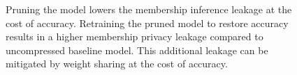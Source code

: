 \begin{figure}[!htb]
    \centering
    \begin{minipage}[b]{1\linewidth}
    \centering

    \end{minipage}
    \caption{Pruning the model lowers the membership inference leakage at the cost of accuracy. Retraining the pruned model to restore accuracy results in a higher membership privacy leakage compared to uncompressed baseline model. This additional leakage can be mitigated by weight sharing at the cost of accuracy.}
    \label{fig:NIAcause}
\end{figure}


